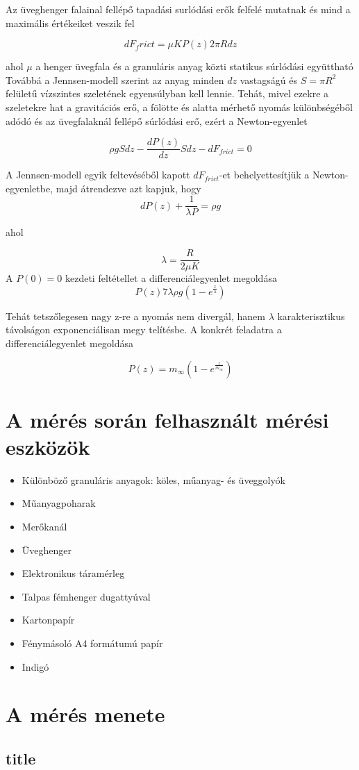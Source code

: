 \documentclass{article}
\begin{document}
	
	Az üveghenger falainal fellépő tapadási surlódási erők felfelé mutatnak és mind a maximális értékeiket veszik fel
	
	$$dF_frict=\mu KP( z )2\pi Rdz$$
	
	
	ahol $\mu$ a henger üvegfala és a granuláris anyag közti statikus súrlódási együttható
	Továbbá a Jennsen-modell szerint az anyag minden $dz$ vastagságú és $S=\pi R^2$ felületű vízszintes szeletének egyensúlyban kell lennie. Tehát, mivel ezekre a szeletekre hat a gravitációs erő, a fölötte és alatta mérhető nyomás különbségéből adódó és az üvegfalaknál fellépő súrlódási erő, ezért a Newton-egyenlet
	
	$$\rho gSdz-\frac{dP( z )}{dz} Sdz-dF_{frict}=0$$
	
	
	A Jennsen-modell egyik feltevéséből kapott $dF_{frict}$-et behelyettesítjük a Newton-egyenletbe, majd átrendezve azt kapjuk, hogy 
	$${dP( z )}+ \frac{1}{\lambda P}=\rho g$$
	
	
	
	ahol
	
	
	$$\lambda = \frac{R}{2 \mu K}$$
	A $P(0)=0$ kezdeti feltétellet a differenciálegyenlet megoldása 
	$$P(z) 7 \lambda \rho g \left(1 - e^{\frac{z}{\lambda}}\right)$$
	
	
	Tehát tetszőlegesen nagy z-re a nyomás nem divergál, hanem $\lambda$ karakterisztikus távolságon exponenciálisan megy telítésbe. A konkrét feladatra a differenciálegyenlet megoldása
	
	$$P(z) = m_\infty \left( 1-e^{\frac{z}{m_\infty}}\right)$$
	
	
	\section{A mérés során felhasznált mérési eszközök}
	\begin{itemize}
		\item Különböző granuláris anyagok: köles, műanyag- és üveggolyók
		\item Műanyagpoharak
		\item Merőkanál
		\item Üveghenger
		\item Elektronikus táramérleg
		\item Talpas fémhenger dugattyúval
		\item Kartonpapír
		\item Fénymásoló A4 formátumú papír
		\item Indigó
	\end{itemize}
	
	\section{A mérés menete}
	\subsection{title}
\end{document}
